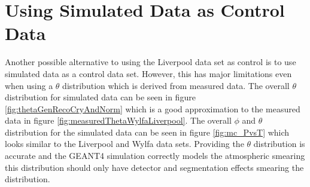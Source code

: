 \section{Using Simulated Data as Control Data}\label{sec:usingSimulatedDataAsControlData}
Another possible alternative to using the Liverpool data set as control is to use simulated data as a control data set. However, this has major limitations even when using a $\theta$ distribution which is derived from measured data. The overall $\theta$ distribution for simulated data can be seen in figure \ref{fig:thetaGenRecoCryAndNorm} which is a good approximation to the measured data in figure \ref{fig:measuredThetaWylfaLiverpool}. The overall $\phi$ and $\theta$ distribution for the simulated data can be seen in figure \ref{fig:mc_PvsT} which looks similar to the Liverpool and Wylfa data sets. Providing the $\theta$ distribution is accurate and the GEANT4 simulation correctly models the atmospheric smearing this distribution should only have detector and segmentation effects smearing the distribution. 


